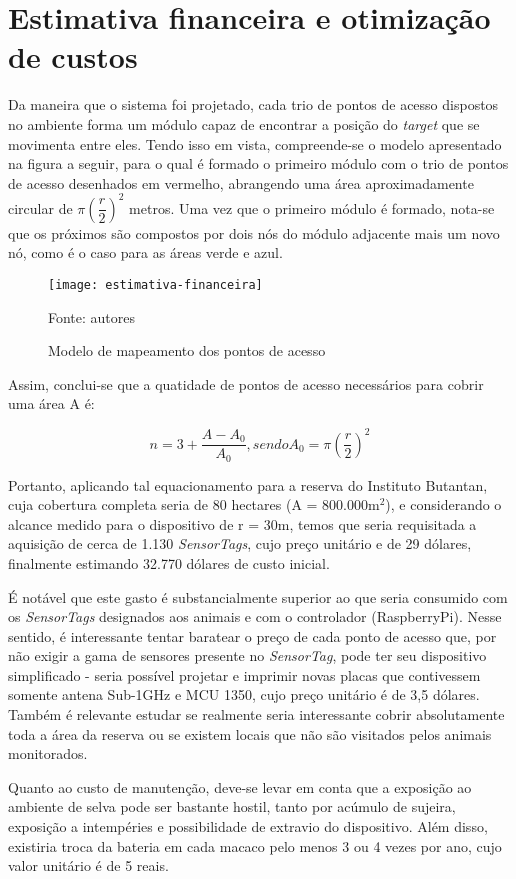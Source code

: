 \chapter{Estimativa financeira e otimização de custos}

Da maneira que o sistema foi projetado, cada trio de pontos de acesso dispostos no ambiente forma um módulo capaz de encontrar a posição do \emph{target} que se movimenta entre eles. Tendo isso em vista, compreende-se o modelo apresentado na figura a seguir, para o qual é formado o primeiro módulo com o trio de pontos de acesso desenhados em vermelho, abrangendo uma área aproximadamente circular de $\pi (\dfrac{r}{2})^2$ metros. Uma vez que o primeiro módulo é formado, nota-se que os próximos são compostos por dois nós do módulo adjacente mais um novo nó, como é o caso para as áreas verde e azul.

\begin{figure}[ht]
  \centering
    \caption{Modelo de mapeamento dos pontos de acesso}
    \texttt{[image: estimativa-financeira]}
	\centerline{\small{Fonte: autores}}
\end{figure}
\FloatBarrier

Assim, conclui-se que a quatidade de pontos de acesso necessários para cobrir uma área A é:

\begin{equation}
n = 3 + \dfrac{A - A_0}{A_0}, sendo A_0 = \pi (\dfrac{r}{2})^2
\end{equation}

Portanto, aplicando tal equacionamento para a reserva do Instituto Butantan, cuja cobertura completa seria de 80 hectares (A = 800.000m$^2$), e considerando o alcance medido para o dispositivo de r = 30m, temos que seria requisitada a aquisição de cerca de 1.130 \emph{SensorTags}, cujo preço unitário e de 29 dólares, finalmente estimando 32.770 dólares de custo inicial.

É notável que este gasto é substancialmente superior ao que seria consumido com os \emph{SensorTags} designados aos animais e com o controlador (RaspberryPi). Nesse sentido, é interessante tentar baratear o preço de cada ponto de acesso que, por não exigir a gama de sensores presente no \emph{SensorTag}, pode ter seu dispositivo simplificado - seria possível projetar e imprimir novas placas que contivessem somente antena Sub-1GHz e MCU 1350, cujo preço unitário é de 3,5 dólares. Também é relevante estudar se realmente seria interessante cobrir absolutamente toda a área da reserva ou se existem locais que não são visitados pelos animais monitorados.

Quanto ao custo de manutenção, deve-se levar em conta que a exposição ao ambiente de selva pode ser bastante hostil, tanto por acúmulo de sujeira, exposição a intempéries e possibilidade de extravio do dispositivo. Além disso, existiria troca da bateria em cada macaco pelo menos 3 ou 4 vezes por ano, cujo valor unitário é de 5 reais.